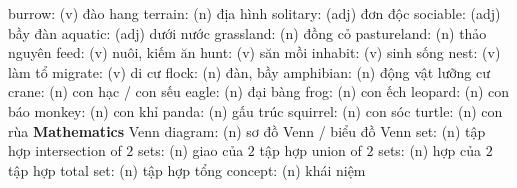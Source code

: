 \begin{multicols}{2}
{			\vskip 0.1cm
			{\color{toancuabi}burrow:} (v)  đào hang
			\vskip 0.1cm
			{\color{toancuabi}terrain:} (n)  địa hình
			\vskip 0.1cm
			{\color{toancuabi}solitary:} (adj)  đơn độc
			\vskip 0.1cm
			{\color{toancuabi}sociable:} (adj)  bầy đàn
			\vskip 0.1cm
			{\color{toancuabi}aquatic:} (adj)  dưới nước
			\vskip 0.1cm
			{\color{toancuabi}grassland:} (n)  đồng cỏ
			\vskip 0.1cm
			{\color{toancuabi}pastureland:} (n)  thảo nguyên
			\vskip 0.1cm
			{\color{toancuabi}feed:} (v)  nuôi, kiếm ăn
			\vskip 0.1cm
			{\color{toancuabi}hunt:} (v)  săn mồi 
			\vskip 0.1cm
			{\color{toancuabi}inhabit:} (v)  sinh sống 
			\vskip 0.1cm
			{\color{toancuabi}nest:} (v)  làm tổ 
			\vskip 0.1cm
			{\color{toancuabi}migrate:} (v)  di cư
			\vskip 0.1cm
			{\color{toancuabi}flock:} (n)  đàn, bầy
			\vskip 0.1cm
			{\color{toancuabi}amphibian:} (n)  động vật lưỡng cư
			\vskip 0.1cm
			{\color{toancuabi}crane:} (n)  con hạc / con sếu
			\vskip 0.1cm
			{\color{toancuabi}eagle:} (n)  đại bàng
			\vskip 0.1cm
			{\color{toancuabi}frog:} (n)  con ếch
			\vskip 0.1cm
			{\color{toancuabi}leopard:} (n)  con báo
			\vskip 0.1cm
			{\color{toancuabi}monkey:} (n)  con khỉ
			\vskip 0.1cm
			{\color{toancuabi}panda:} (n)  gấu trúc
			\vskip 0.1cm
			{\color{toancuabi}squirrel:} (n)  con sóc
			\vskip 0.1cm
			{\color{toancuabi}turtle:} (n)  con rùa 
			\vskip 0.1cm
			\textbf{\color{toancuabi}Mathematics}
			\vskip 0.1cm
			{\color{toancuabi}Venn diagram:} (n)  sơ đồ Venn / biểu đồ Venn
			\vskip 0.1cm
			{\color{toancuabi}set:} (n)  tập hợp
			\vskip 0.1cm
			{\color{toancuabi}intersection of $2$ sets:} (n)  giao của $2$ tập hợp
			\vskip 0.1cm
			{\color{toancuabi}union of $2$ sets:} (n)  hợp của $2$ tập hợp
			\vskip 0.1cm
			{\color{toancuabi}total set:} (n)  tập hợp tổng
			\vskip 0.1cm
			{\color{toancuabi}concept:} (n)  khái niệm}
\end{multicols}
